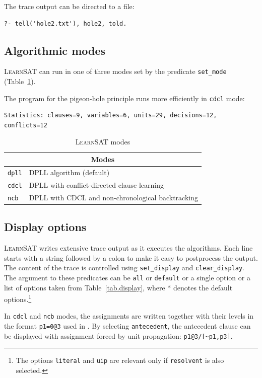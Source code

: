\documentclass[11pt]{report}
\newcommand*{\p}[1]{\textup{\texttt{#1}}}
\newcommand*{\ls}{\textsc{LearnSAT}}
\begin{document}
The trace output can be directed to a file:

\begin{verbatim}
?- tell('hole2.txt'), hole2, told.
\end{verbatim}

\newpage

\subsection{Algorithmic modes}

\ls{} can run in one of three modes set by the predicate \p{set\_mode}
(Table~\ref{tab.modes}).

The program for the pigeon-hole principle runs more efficiently in
\p{cdcl} mode:
\begin{verbatim}
Statistics: clauses=9, variables=6, units=29, decisions=12, conflicts=12
\end{verbatim}

\begin{table}[*hb]
\begin{center}
\begin{tabular}{|l|l|}
\hline
\multicolumn{2}{|c|}{\textbf{\large Modes}}\\
\hline
\p{dpll} & DPLL algorithm (default)\\
\p{cdcl} & DPLL with conflict-directed clause learning\\
\p{ncb} &  DPLL with CDCL and non-chronological backtracking\\
\hline
\end{tabular}
\caption{\ls{} modes}\label{tab.modes}
\end{center}
\end{table}

\subsection{Display options}

\ls{} writes extensive trace output as it executes the algorithms. Each
line starts with a string followed by a colon to make it easy to
postprocess the output. The content of the trace is controlled using
\p{set\_display} and \p{clear\_display}. The argument to these
predicates can be \p{all} or \p{default} or a single option or a list of
options taken from Table~\ref{tab.display}, where * denotes the default
options.\footnote{The options \p{literal} and \p{uip} are relevant only
if \p{resolvent} is also selected.}

In \p{cdcl} and \p{ncb} modes, the assignments are written together with
their levels in the format \p{p1=0@3} used in \cite{mlm}.
By selecting \p{antecedent}, the antecedent clause can be displayed with
assignment forced by unit propagation:
\verb+p1@3/[~p1,p3]+.
\end{document}
